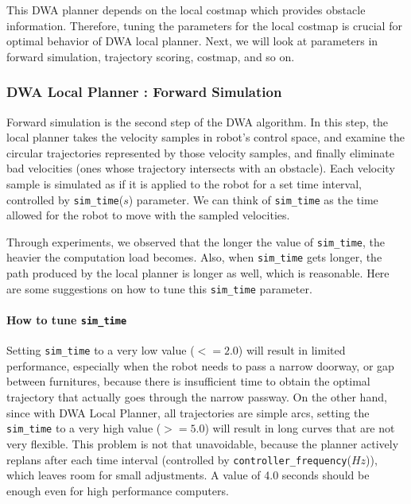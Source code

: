 \documentclass[12pt]{article}
\begin{document}
This DWA planner depends on the local costmap which provides obstacle information. Therefore, tuning the parameters for the local costmap is crucial for optimal behavior of DWA local planner. Next, we will look at parameters in forward simulation, trajectory scoring, costmap, and so on.

\subsubsection{DWA Local Planner : Forward Simulation}

Forward simulation is the second step of the DWA algorithm. In this step, the local planner takes the velocity samples in robot's control space, and examine the circular trajectories represented by those velocity samples, and finally
eliminate bad velocities (ones whose trajectory intersects with an obstacle). Each velocity sample is simulated as if it is applied to the robot for a set time interval, controlled by \texttt{sim\_time}($s$)
parameter. We can think of \texttt{sim\_time} as the time allowed for the robot to move with the sampled velocities.

Through experiments, we observed that the longer the value of \texttt{sim\_time}, the heavier the computation load becomes. Also, when \texttt{sim\_time} gets
longer, the path produced by the local planner is longer as well, which is reasonable. Here are some suggestions on how to tune this \texttt{sim\_time} parameter.

\paragraph{How to tune \texttt{sim\_time}}
Setting \texttt{sim\_time} to a very low value ($<= 2.0$) will result in limited performance, especially when the robot needs to pass a narrow doorway, or gap between furnitures, because there is insufficient time to obtain the optimal trajectory that actually goes through the narrow passway. On the other hand, since with DWA Local Planner, all trajectories are simple arcs,
setting the \texttt{sim\_time} to a very high value ($>= 5.0$) will result in long curves that are not very flexible. This problem is not that unavoidable,
because the planner actively replans after each time interval (controlled by \texttt{controller\_frequency}($Hz$)), which leaves room for small adjustments. A value of 4.0 seconds should be enough even for high performance computers.
\end{document}
